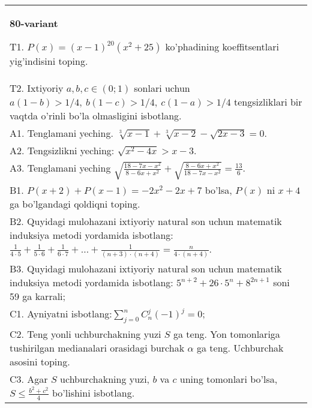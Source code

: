 \documentclass{article}
\begin{document}
\begin{tabular}{m{17cm}}
\textbf{80-variant}
\newline

T1. \(P(x) = (x - 1)^{20}\left( x^{2} + 25 \right)\) ko'phadining koeffitsentlari yig'indisini toping. \\
T2. Ixtiyoriy \(a,b,c \in (0;1)\) sonlari uchun \(a(1 - b) > 1/4,\ b(1 - c) > 1/4,\ c(1 - a) > 1/4\) tengsizliklari bir vaqtda o'rinli bo'la olmasligini isbotlang. \\
A1. Tenglamani yeching. \(\sqrt[3]{x - 1} + \sqrt[3]{x - 2} - \sqrt{2x - 3} = 0\). \\
A2. Tengsizlikni yeching: \(\sqrt{x^{2} - 4x} > x - 3\). \\
A3. Tenglamani yeching \(\sqrt{\frac{18 - 7x - x^{2}}{8 - 6x + x^{2}}} + \sqrt{\frac{8 - 6x + x^{2}}{18 - 7x - x^{2}}} = \frac{13}{6}\). \\
B1. \(P(x + 2) + P(x - 1) = - 2x^{2} - 2x + 7\) bo'lsa, \(P(x)\) ni \(x + 4\) ga bo'lgandagi qoldiqni toping. \\
B2. Quyidagi mulohazani ixtiyoriy natural son uchun matematik induksiya metodi yordamida isbotlang: \(\frac{1}{4 \cdot 5} + \frac{1}{5 \cdot 6} + \frac{1}{6 \cdot 7} + \ldots + \frac{1}{(n + 3) \cdot (n + 4)} = \frac{n}{4 \cdot (n + 4)}\). \\
B3. Quyidagi mulohazani ixtiyoriy natural son uchun matematik induksiya metodi yordamida isbotlang: \(5^{n + 2} + 26 \cdot 5^{n} + 8^{2n + 1}\) soni 59 ga karrali; \\
C1. Ayniyatni isbotlang:\(\sum_{j = 0}^{n}C_{n}^{j}( - 1)^{j} = 0\); \\
C2. Teng yonli uchburchakning yuzi \(S\) ga teng. Yon tomonlariga tushirilgan medianalari orasidagi burchak \(\alpha\) ga teng. Uchburchak asosini toping. \\
C3. Agar \(S\) uchburchakning yuzi, \(b\) va \(c\) uning tomonlari bo'lsa, \(S \leq \frac{b^{2} + c^{2}}{4}\) bo'lishini isbotlang. \\

\end{tabular}
\vspace{1cm}
\end{document}
